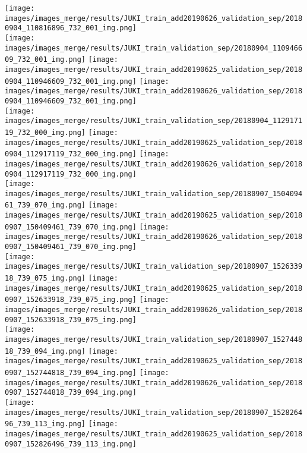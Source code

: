 \begin{center}
\texttt{[image: images/images\_merge/results/JUKI\_train\_add20190626\_validation\_sep/20180904\_110816896\_732\_001\_img.png]}\\
\texttt{[image: images/images\_merge/results/JUKI\_train\_validation\_sep/20180904\_110946609\_732\_001\_img.png]}
\texttt{[image: images/images\_merge/results/JUKI\_train\_add20190625\_validation\_sep/20180904\_110946609\_732\_001\_img.png]}
\texttt{[image: images/images\_merge/results/JUKI\_train\_add20190626\_validation\_sep/20180904\_110946609\_732\_001\_img.png]}\\
\texttt{[image: images/images\_merge/results/JUKI\_train\_validation\_sep/20180904\_112917119\_732\_000\_img.png]}
\texttt{[image: images/images\_merge/results/JUKI\_train\_add20190625\_validation\_sep/20180904\_112917119\_732\_000\_img.png]}
\texttt{[image: images/images\_merge/results/JUKI\_train\_add20190626\_validation\_sep/20180904\_112917119\_732\_000\_img.png]}\\
\texttt{[image: images/images\_merge/results/JUKI\_train\_validation\_sep/20180907\_150409461\_739\_070\_img.png]}
\texttt{[image: images/images\_merge/results/JUKI\_train\_add20190625\_validation\_sep/20180907\_150409461\_739\_070\_img.png]}
\texttt{[image: images/images\_merge/results/JUKI\_train\_add20190626\_validation\_sep/20180907\_150409461\_739\_070\_img.png]}\\
\texttt{[image: images/images\_merge/results/JUKI\_train\_validation\_sep/20180907\_152633918\_739\_075\_img.png]}
\texttt{[image: images/images\_merge/results/JUKI\_train\_add20190625\_validation\_sep/20180907\_152633918\_739\_075\_img.png]}
\texttt{[image: images/images\_merge/results/JUKI\_train\_add20190626\_validation\_sep/20180907\_152633918\_739\_075\_img.png]}\\
\texttt{[image: images/images\_merge/results/JUKI\_train\_validation\_sep/20180907\_152744818\_739\_094\_img.png]}
\texttt{[image: images/images\_merge/results/JUKI\_train\_add20190625\_validation\_sep/20180907\_152744818\_739\_094\_img.png]}
\texttt{[image: images/images\_merge/results/JUKI\_train\_add20190626\_validation\_sep/20180907\_152744818\_739\_094\_img.png]}\\
\texttt{[image: images/images\_merge/results/JUKI\_train\_validation\_sep/20180907\_152826496\_739\_113\_img.png]}
\texttt{[image: images/images\_merge/results/JUKI\_train\_add20190625\_validation\_sep/20180907\_152826496\_739\_113\_img.png]}

\end{center}
